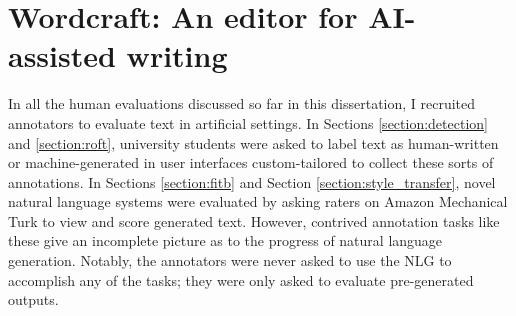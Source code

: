 

\section{Wordcraft: An editor for AI-assisted writing}
\label{section:wordcraft}

In all the human evaluations discussed so far in this dissertation, I recruited annotators to evaluate text in artificial settings.
In Sections \ref{section:detection} and \ref{section:roft}, university students were asked to label text as human-written or machine-generated in user interfaces custom-tailored to collect these sorts of annotations.
In Sections \ref{section:fitb} and Section \ref{section:style_transfer}, novel natural language systems were evaluated by asking raters on Amazon Mechanical Turk to view and score generated text.
However, contrived annotation tasks like these give an incomplete picture as to the progress of natural language generation.
Notably, the annotators were never asked to use the NLG to accomplish any of the tasks; they were only asked to evaluate pre-generated outputs.

